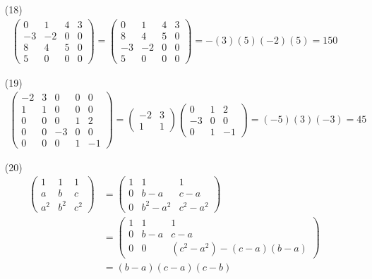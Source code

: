 \documentclass[11pt]{report}
\begin{document}
\begin{itemize}
\item[(18)]
\begin{align}
\begin{pmatrix} 0 & 1 & 4 & 3 \\ -3 & -2 & 0 & 0 \\ 8 & 4 & 5 & 0 \\ 5 & 0 & 0 & 0\end{pmatrix} = \begin{pmatrix} 0 & 1 & 4 & 3 \\ 8 & 4 & 5 & 0 \\-3 & -2 & 0 & 0 \\ 5 & 0 & 0 & 0\end{pmatrix} = -(3)(5)(-2)(5) = 150
\end{align}

\item[(19)]
\begin{align}
\begin{pmatrix} -2 & 3 & 0 & 0 & 0 \\ 1 & 1 & 0 & 0 & 0 \\ 0 & 0 & 0 & 1 & 2 \\ 0 & 0 & -3 & 0 & 0 \\ 0 & 0 & 0 & 1 & -1\end{pmatrix} = \begin{pmatrix}-2 & 3 \\ 1 & 1\end{pmatrix} \begin{pmatrix} 0 & 1 & 2 \\ -3 & 0 & 0 \\ 0 & 1 & -1\end{pmatrix}  = (-5)(3)(-3) = 45
\end{align}
 
\item[(20)] 
\begin{align}
\begin{pmatrix}1 & 1 & 1 \\ a & b & c \\ a^2 & b^2 & c^2 \end{pmatrix} &= \begin{pmatrix}1 & 1 & 1 \\ 0 & b-a & c-a \\ 0 & b^2-a^2 &c^2-a^2\end{pmatrix} \\
&= \begin{pmatrix}1 & 1 & 1 \\  0 & b-a & c-a \\ 0 & 0 & (c^2-a^2)-(c-a)(b-a)\end{pmatrix} \\
&= (b-a) (c-a) (c-b)
\end{align}
\end{itemize}
\end{document}
